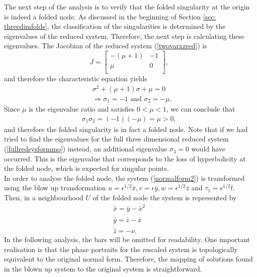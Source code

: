 The next step of the analysis is to verify that the folded singularity at the origin is indeed a folded node.
As discussed in the beginning of Section \ref{sec: threedimfolds}, the classification of the singularities is determined by the eigenvalues of the reduced system. Therefore, the next step is calculating these eigenvalues.
The Jacobian of the reduced system (\ref{twovarxzred}) is
\begin{equation}
J=\begin{bmatrix}
-(\mu +1) & -1 \\
\mu & 0 \\
\end{bmatrix},
\end{equation}
and therefore the characteristic equation yields
\begin{align*}
&\sigma^2 +(\mu +1)\sigma + \mu = 0 \\
&\Rightarrow \sigma_1= -1 \textrm{\ \ \ and \ \ \ } \sigma_2 = -\mu.
\end{align*}
Since $\mu$ is the eigenvalue ratio and satisfies $0< \mu < 1$, we can conclude that
\begin{align*}
\sigma_1\sigma_2 = (-1)(-\mu)=\mu >0,
\end{align*}
and therefore the folded singularity is in fact a folded node. Note that if we had tried to find the eigenvalues for the full three dimensional reduced system (\ref{fullredsysformmo}) instead, an additional eigenvalue $\sigma_3=0$ would have occurred. This is the eigenvalue that corresponds to the loss of hyperbolicity at the folded node, which is expected for singular points.\\

In order to analyse the folded node, the system (\ref{normalform2}) is transformed using the blow up transformation $u= \epsilon^{1/2}\bar{x}, v=\epsilon \bar{y}, w= \epsilon^{1/2} \bar{z}$ and $ \tau_1 = \epsilon^{1/2} \bar{t}$.
Then, in a neighbourhood $U$ of the folded node the system is represented by
\begin{align*}
\dot{\bar{x}}= \bar{y} - \bar{x}^2\\
\dot{\bar{y}}=\bar{z} - \bar{x} \\
\dot{\bar{z}}= - \nu.
\end{align*}
In the following analysis, the bars will be omitted for readability.
One important realisation is that the phase portraits for the rescaled system is topologically equivalent to the original normal form. Therefore, the mapping of solutions  found in the blown up system to the original system is straightforward.\\

